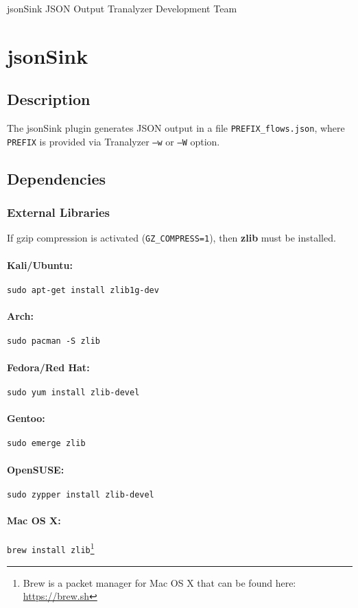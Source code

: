 \documentclass[documentation]{subfiles}
\begin{document}
\trantitle
    {jsonSink}
    {JSON Output}
    {Tranalyzer Development Team} %

\section{jsonSink}\label{s:jsonSink}

\subsection{Description}
The jsonSink plugin generates JSON output in a file {\tt PREFIX\_flows.json}, where {\tt PREFIX} is provided via Tranalyzer {\tt --w} or {\tt --W} option.

\subsection{Dependencies}

\subsubsection{External Libraries}
If gzip compression is activated ({\tt GZ\_COMPRESS=1}), then {\bf zlib} must be installed.

\paragraph{Kali/Ubuntu:} {\tt sudo apt-get install zlib1g-dev}
\paragraph{Arch:} {\tt sudo pacman -S zlib}
\paragraph{Fedora/Red Hat:} {\tt sudo yum install zlib-devel}
\paragraph{Gentoo:} {\tt sudo emerge zlib}
\paragraph{OpenSUSE:} {\tt sudo zypper install zlib-devel}
\paragraph{Mac OS X:} {\tt brew install zlib}\footnote{Brew is a packet manager for Mac OS X that can be found here: \url{https://brew.sh}}
\end{document}
